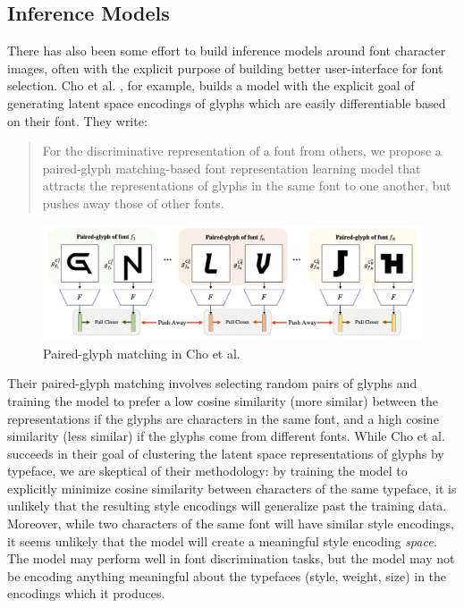 \subsection{Inference Models}

There has also been some effort to build inference models around font character images, often with the explicit purpose of building better user-interface for font selection. Cho et al. \cite{cho2022}, for example, builds a model with the explicit goal of generating latent space encodings of glyphs which are easily differentiable based on their font. They write:

\begin{quote}
    For the discriminative representation of a font from others, we propose a paired-glyph matching-based font representation learning model that attracts the representations of glyphs in the same font to one another, but pushes away those of other fonts.
\end{quote}

\begin{figure}[htbp]
    \centering
    \includegraphics[width=1\textwidth]{images/cho-paired-glyph.png}
    \caption{Paired-glyph matching in Cho et al.}
    \label{fig:cho-paired-glyph}
\end{figure}

Their paired-glyph matching involves selecting random pairs of glyphs and training the model to prefer a low cosine similarity (more similar) between the representations if the glyphs are characters in the same font, and a high cosine similarity (less similar) if the glyphs come from different fonts. While Cho et al. succeeds in their goal of clustering the latent space representations of glyphs by typeface, we are skeptical of their methodology: by training the model to explicitly minimize cosine similarity between characters of the same typeface, it is unlikely that the resulting style encodings will generalize past the training data. Moreover, while two characters of the same font will have similar style encodings, it seems unlikely that the model will create a meaningful style encoding \textit{space.} The model may perform well in font discrimination tasks, but the model may not be encoding anything meaningful about the typefaces (style, weight, size) in the encodings which it produces.

